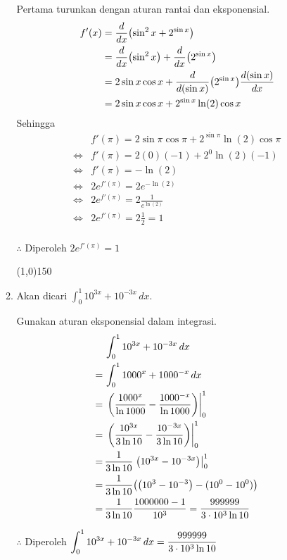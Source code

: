 \begin{enumerate}[leftmargin=*, label={\arabic*}.]
\begin{enumerate}[label={\alph*}.]
    Pertama turunkan dengan aturan rantai dan eksponensial.
    \begin{align*}
        f'(x) &= \drv{x}{\sin^{2}x+2^{\sin x}}\\
        &= \drv{x}{\sin^{2}x}+\drv{x}{2^{\sin x}}\\
        &= 2\sin x\cos x+\drv{(\sin x)}{2^{\sin x}}\frac{d(\sin x)}{dx}\\
        &= 2\sin x\cos x+2^{\sin x}\ln(2)\cos x
    \end{align*}
    Sehingga 
    \begin{align*}
        &f'(\pi) = 2\sin \pi\cos \pi+2^{\sin \pi}\ln(2)\cos \pi\\
        \iff &f'(\pi) = 2(0)(-1)+2^{0}\ln(2)(-1)\\
        \iff &f'(\pi) = -\ln(2)\\
        \iff &2e^{f'(\pi)} = 2e^{-\ln(2)}\\
        \iff &2e^{f'(\pi)} = 2\frac{1}{e^{\ln(2)}}\\
        \iff &2e^{f'(\pi)} = 2\frac{1}{2} = 1\\
    \end{align*}

    $\therefore$ Diperoleh $2e^{f'(\pi)} = 1$


\begin{center}\line(1,0){150}\end{center}


    \item Akan dicari $\int_{0}^{1} 10^{3x}+10^{-3x}\,dx$.
    
    Gunakan aturan eksponensial dalam integrasi.
    \begin{align*}
        &\int_{0}^{1} 10^{3x}+10^{-3x}\,dx\\
        =\,&\int_{0}^{1} 1000^{x}+1000^{-x}\,dx\\
        =\,&\eval{\frac{1000^{x}}{\ln 1000}-\frac{1000^{-x}}{\ln 1000}}{0}{1}\\
        =\,&\eval{\frac{10^{3x}}{3\ln 10}-\frac{10^{-3x}}{3\ln 10}}{0}{1}\\
        =\,&\frac{1}{3\ln 10}\eval{10^{3x}-10^{-3x}}{0}{1}\\
        =\,&\frac{1}{3\ln 10}\brk*{\brk*{10^{3}-10^{-3}}-(10^{0}-10^{0})}\\
        =\,&\frac{1}{3\ln 10}\frac{1000000-1}{10^{3}} = \frac{999999}{3\cdot10^{3}\ln10}
    \end{align*}

    $\therefore$ Diperoleh $\displaystyle\int_{0}^{1} 10^{3x}+10^{-3x}\,dx 
    = \frac{999999}{3\cdot10^{3}\ln10}$


\end{enumerate}
\end{enumerate}
